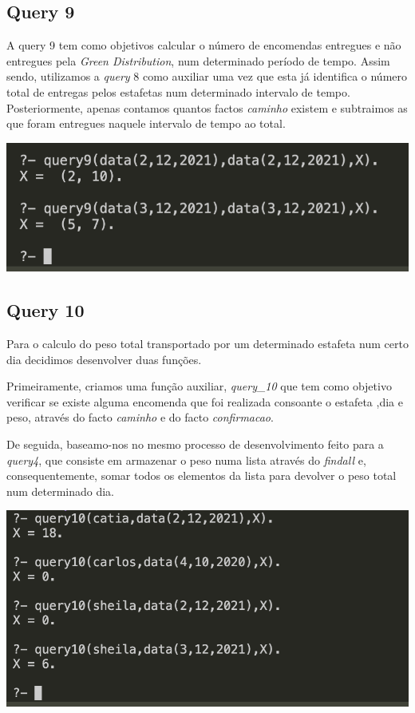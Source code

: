 \documentclass[a4paper,12pt]{article}
\begin{document}
    \subsection{Query 9}
        A query 9 tem como objetivos calcular o número de encomendas entregues e não entregues pela \emph{Green Distribution}, num determinado período de tempo. Assim sendo, utilizamos a \emph{query} 8 como auxiliar uma vez que esta já identifica o número total de entregas pelos estafetas num determinado intervalo de tempo. Posteriormente, apenas contamos quantos factos \emph{caminho} existem e subtraimos as que foram entregues naquele intervalo de tempo ao total.\par
        
        \begin{center}
            \includegraphics[scale=0.6]{imagens/query9.png}
        \end{center}
    
    \subsection{Query 10}
        Para o calculo do peso total transportado por um determinado estafeta num certo dia decidimos desenvolver duas funções.\par
        Primeiramente, criamos uma função auxiliar, \emph{query\_10} que tem como objetivo verificar se existe alguma encomenda que foi realizada consoante o estafeta ,dia e peso, através do facto \emph{caminho} e do facto \emph{confirmacao}.\par
        De seguida, baseamo-nos no mesmo processo de desenvolvimento feito para a \emph{query4}, que consiste em armazenar o peso numa lista através do \emph{findall} e, consequentemente, somar todos os elementos da lista para devolver o peso total num determinado dia.\par
        
        \begin{center}
            \includegraphics[scale=0.8]{imagens/query10.png}
        \end{center}
    
\end{document}
